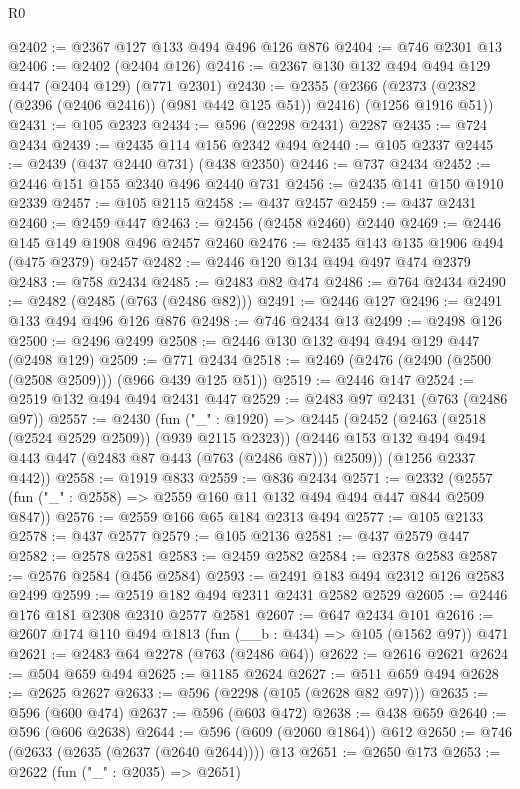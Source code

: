\begin{lexlean}{R0}
\begin{coremodule}
@2402 := @2367 @127 @133 @494 @496 @126 @876
@2404 := @746 @2301 @13
@2406 := @2402 (@2404 @126)
@2416 := @2367 @130 @132 @494 @494 @129 @447 (@2404 @129) (@771 @2301)
@2430 := @2355
    (@2366 (@2373 (@2382 (@2396 (@2406 @2416)) (@981 @442 @125 @51)) @2416) (@1256 @1916 @51))
@2431 := @105 @2323
@2434 := @596 (@2298 @2431) @2287
@2435 := @724 @2434
@2439 := @2435 @114 @156 @2342 @494
@2440 := @105 @2337
@2445 := @2439 (@437 @2440 @731) (@438 @2350)
@2446 := @737 @2434
@2452 := @2446 @151 @155 @2340 @496 @2440 @731
@2456 := @2435 @141 @150 @1910 @2339
@2457 := @105 @2115
@2458 := @437 @2457
@2459 := @437 @2431
@2460 := @2459 @447
@2463 := @2456 (@2458 @2460) @2440
@2469 := @2446 @145 @149 @1908 @496 @2457 @2460
@2476 := @2435 @143 @135 @1906 @494 (@475 @2379) @2457
@2482 := @2446 @120 @134 @494 @497 @474 @2379
@2483 := @758 @2434
@2485 := @2483 @82 @474
@2486 := @764 @2434
@2490 := @2482 (@2485 (@763 (@2486 @82)))
@2491 := @2446 @127
@2496 := @2491 @133 @494 @496 @126 @876
@2498 := @746 @2434 @13
@2499 := @2498 @126
@2500 := @2496 @2499
@2508 := @2446 @130 @132 @494 @494 @129 @447 (@2498 @129)
@2509 := @771 @2434
@2518 := @2469 (@2476 (@2490 (@2500 (@2508 @2509))) (@966 @439 @125 @51))
@2519 := @2446 @147
@2524 := @2519 @132 @494 @494 @2431 @447
@2529 := @2483 @97 @2431 (@763 (@2486 @97))
@2557 := @2430
    (fun ("_" : @1920) =>
    @2445
      (@2452
        (@2463 (@2518 (@2524 @2529 @2509)) (@939 @2115 @2323))
        (@2446 @153 @132 @494 @494 @443 @447 (@2483 @87 @443 (@763 (@2486 @87))) @2509))
      (@1256 @2337 @442))
@2558 := @1919 @833
@2559 := @836 @2434
@2571 := @2332 (@2557 (fun ("_" : @2558) => @2559 @160 @11 @132 @494 @494 @447 @844 @2509 @847))
@2576 := @2559 @166 @65 @184 @2313 @494
@2577 := @105 @2133
@2578 := @437 @2577
@2579 := @105 @2136
@2581 := @437 @2579 @447
@2582 := @2578 @2581
@2583 := @2459 @2582
@2584 := @2378 @2583
@2587 := @2576 @2584 (@456 @2584)
@2593 := @2491 @183 @494 @2312 @126 @2583 @2499
@2599 := @2519 @182 @494 @2311 @2431 @2582 @2529
@2605 := @2446 @176 @181 @2308 @2310 @2577 @2581
@2607 := @647 @2434 @101
@2616 := @2607 @174 @110 @494 @1813 (fun (__b : @434) => @105 (@1562 @97)) @471
@2621 := @2483 @64 @2278 (@763 (@2486 @64))
@2622 := @2616 @2621
@2624 := @504 @659 @494
@2625 := @1185 @2624
@2627 := @511 @659 @494
@2628 := @2625 @2627
@2633 := @596 (@2298 (@105 (@2628 @82 @97)))
@2635 := @596 (@600 @474)
@2637 := @596 (@603 @472)
@2638 := @438 @659
@2640 := @596 (@606 @2638)
@2644 := @596 (@609 (@2060 @1864)) @612
@2650 := @746 (@2633 (@2635 (@2637 (@2640 @2644)))) @13
@2651 := @2650 @173
@2653 := @2622 (fun ("_" : @2035) => @2651)

\end{coremodule}
\end{lexlean}
